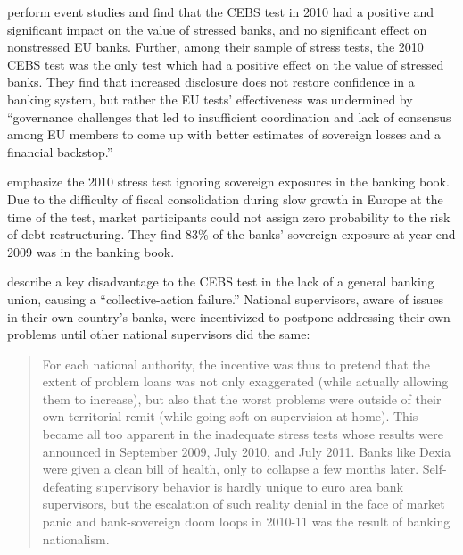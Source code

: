 \documentclass[12pt]{article}
\begin{document}
\citet{Candelon} perform event studies and find that the CEBS test in 2010 had a positive and significant impact on the value of stressed banks, and no significant effect on nonstressed EU banks. Further, among their sample of stress tests, the 2010 CEBS test was the only test which had a positive effect on the value of stressed banks. They find that increased disclosure does not restore confidence in a banking system, but rather the EU tests' effectiveness was undermined by ``governance challenges that led to insufficient coordination and lack of consensus among EU members to come up with better estimates of sovereign losses and a financial backstop.''

\citet{OECD} emphasize the 2010 stress test ignoring sovereign exposures in the banking book. Due to the difficulty of fiscal consolidation during slow growth in Europe at the time of the test, market participants could not assign zero probability to the risk of debt restructuring. They find 83\% of the banks' sovereign exposure at year-end 2009 was in the banking book.

\citet{Posen} describe a key disadvantage to the CEBS test in the lack of a general banking union, causing a ``collective-action failure.'' National supervisors, aware of issues in their own country's banks, were incentivized to postpone addressing their own problems until other national supervisors did the same:

\begin{quote}
For each national authority, the incentive was thus to pretend that the extent of problem loans was not only exaggerated (while actually allowing them to increase), but also that the worst problems were outside of their own territorial remit (while going soft on supervision at home). This became all too apparent in the inadequate stress tests whose results were announced in September 2009, July 2010, and July 2011. Banks like Dexia were given a clean bill of health, only to collapse a few months later. Self-defeating supervisory behavior is hardly unique to euro area bank supervisors, but the escalation of such reality denial in the face of market panic and bank-sovereign doom loops in 2010-11 was the result of banking nationalism.
\end{quote}

\newpage
{}


\nocite{*}


\newpage
\end{document}
